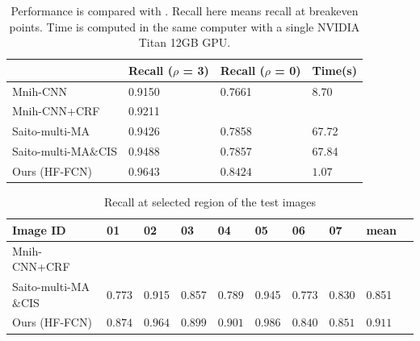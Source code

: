 \documentclass[runningheads]{llncs}
\begin{document}
    \begin{table} 
    \centering
	\caption{Performance is compared with \cite{Mnih2013Machine,Saito2016Multiple}. Recall here  means recall at breakeven points. Time is computed in the same computer with a single NVIDIA Titan 12GB GPU.}
	\begin{tabular}{L{38mm}C{26mm}C{26mm}C{26mm}}     
	\toprule
	& Recall ($\rho$ = 3) & Recall ($\rho$ = 0)& Time(s)\\
	\midrule
	Mnih-CNN \cite{Mnih2013Machine} & 0.9150 & 0.7661 & 8.70  \\ 
	Mnih-CNN+CRF \cite{Mnih2013Machine} & 0.9211&  & \\ 
	Saito-multi-MA \cite{Saito2016Multiple} & 0.9426 & 0.7858 & 67.72 \\
	Saito-multi-MA$\&$CIS \cite{Saito2016Multiple} & 0.9488 & 0.7857 & 67.84 \\
	Ours (HF-FCN) & $\bm{0.9643}$ & $\bm{0.8424}$ & $\bm{1.07}$\\
	\bottomrule
	\end{tabular}
	\label{tab:PerformanceComparision}
	\end{table} 
	 
	\begin{table} 
    \centering
	\caption{Recall at selected region of the test images}
	\begin{tabular}{L{38mm}*{9}{C{9mm}}}     
	\toprule
	Image ID & 01 & 02 & 03 &04 &05 & 06 &07 & mean\\
	\midrule
	Mnih-CNN+CRF\cite{Mnih2013Machine} & &  &  & &\\
	Saito-multi-MA$\&$CIS\cite{Saito2016Multiple} & 0.773 & 0.915 & 0.857 & 0.789 & 0.945 & 0.773 &0.830 & 0.851\\
	Ours (HF-FCN) & $\bm{0.874}$ & $\bm{0.964}$  & $\bm{0.899}$ & $\bm{0.901}$ & $\bm{0.986}$ & $\bm{0.840}$ &  $\bm{0.851}$ & $\bm{0.911}$\\
	\bottomrule
	\end{tabular}
	\label{tab:ComparedResultsRecall}
	\end{table} 
 	 
\end{document}
